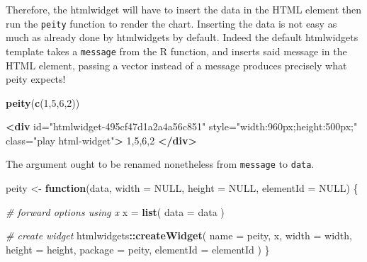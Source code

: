 \documentclass[
  10pt,
]{krantz}
\makeatletter
\newenvironment{Shaded}{\begin{snugshade}}{\end{snugshade}}
\newcommand{\CommentTok}[1]{\textcolor[rgb]{0.37,0.37,0.37}{\textit{#1}}}
\newcommand{\ControlFlowTok}[1]{\textcolor[rgb]{0.27,0.27,0.27}{\textbf{#1}}}
\newcommand{\DataTypeTok}[1]{\textcolor[rgb]{0.27,0.27,0.27}{#1}}
\newcommand{\DecValTok}[1]{\textcolor[rgb]{0.06,0.06,0.06}{#1}}
\newcommand{\KeywordTok}[1]{\textcolor[rgb]{0.27,0.27,0.27}{\textbf{#1}}}
\newcommand{\NormalTok}[1]{#1}
\newcommand{\OperatorTok}[1]{\textcolor[rgb]{0.43,0.43,0.43}{\textbf{#1}}}
\newcommand{\OtherTok}[1]{\textcolor[rgb]{0.37,0.37,0.37}{#1}}
\newcommand{\StringTok}[1]{\textcolor[rgb]{0.5,0.5,0.5}{#1}}
\newenvironment{kframe}{%
\medskip{}
\setlength{\fboxsep}{.8em}
 \def\at@end@of@kframe{}%
 \ifinner\ifhmode%
  \def\at@end@of@kframe{\end{minipage}}%
  \begin{minipage}{\columnwidth}%
 \fi\fi%
 \def\FrameCommand##1{\hskip\@totalleftmargin \hskip-\fboxsep
 \colorbox{shadecolor}{##1}\hskip-\fboxsep
     \hskip-\linewidth \hskip-\@totalleftmargin \hskip\columnwidth}%
 \MakeFramed {\advance\hsize-\width
   \@totalleftmargin\z@ \linewidth\hsize
   \@setminipage}}%
 {\par\unskip\endMakeFramed%
 \at@end@of@kframe}
\renewenvironment{Shaded}{\begin{kframe}}{\end{kframe}}
\makeatother
\begin{document}
Therefore, the htmlwidget will have to insert the data in the HTML element then run the \texttt{peity} function to render the chart. Inserting the data is not easy as much as already done by htmlwidgets by default. Indeed the default htmlwidgets template takes a \texttt{message} from the R function, and inserts said message in the HTML element, passing a vector instead of a message produces precisely what peity expects!

\begin{Shaded}
\begin{Highlighting}[]
\KeywordTok{peity}\NormalTok{(}\KeywordTok{c}\NormalTok{(}\DecValTok{1}\NormalTok{,}\DecValTok{5}\NormalTok{,}\DecValTok{6}\NormalTok{,}\DecValTok{2}\NormalTok{))}
\end{Highlighting}
\end{Shaded}

\begin{Shaded}
\begin{Highlighting}[]
\KeywordTok{<div} 
\OtherTok{  id=}\StringTok{"htmlwidget{-}495cf47d1a2a4a56c851"} 
\OtherTok{  style=}\StringTok{"width:960px;height:500px;"} 
\OtherTok{  class=}\StringTok{"play html{-}widget"}\KeywordTok{>}
\NormalTok{  1,5,6,2}
\KeywordTok{</div>}
\end{Highlighting}
\end{Shaded}

The argument ought to be renamed nonetheless from \texttt{message} to \texttt{data}.

\begin{Shaded}
\begin{Highlighting}[]
\NormalTok{peity <{-}}\StringTok{ }\ControlFlowTok{function}\NormalTok{(data, }\DataTypeTok{width =} \OtherTok{NULL}\NormalTok{, }\DataTypeTok{height =} \OtherTok{NULL}\NormalTok{, }
  \DataTypeTok{elementId =} \OtherTok{NULL}\NormalTok{) \{}

  \CommentTok{\# forward options using x}
\NormalTok{  x =}\StringTok{ }\KeywordTok{list}\NormalTok{(}
    \DataTypeTok{data =}\NormalTok{ data}
\NormalTok{  )}

  \CommentTok{\# create widget}
\NormalTok{  htmlwidgets}\OperatorTok{::}\KeywordTok{createWidget}\NormalTok{(}
    \DataTypeTok{name =} \StringTok{\textquotesingle{}peity\textquotesingle{}}\NormalTok{,}
\NormalTok{    x,}
    \DataTypeTok{width =}\NormalTok{ width,}
    \DataTypeTok{height =}\NormalTok{ height,}
    \DataTypeTok{package =} \StringTok{\textquotesingle{}peity\textquotesingle{}}\NormalTok{,}
    \DataTypeTok{elementId =}\NormalTok{ elementId}
\NormalTok{  )}
\NormalTok{\}}
\end{Highlighting}
\end{Shaded}
\end{document}
